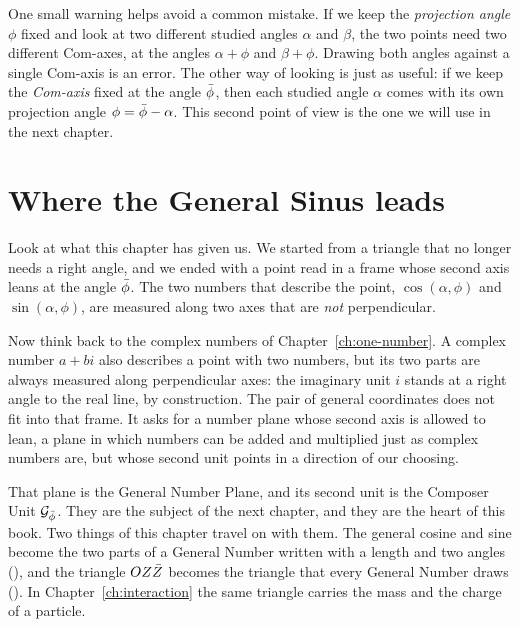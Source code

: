 One small warning helps avoid a common mistake. If we keep the \emph{projection angle} $\phi$ fixed and look at two different studied angles $\alpha$ and $\beta$, the two points need two different Com-axes, at the angles $\alpha + \phi$ and $\beta + \phi$. Drawing both angles against a single Com-axis is an error. The other way of looking is just as useful: if we keep the \emph{Com-axis} fixed at the angle $\bar{\phi}$, then each studied angle $\alpha$ comes with its own projection angle $\phi = \bar{\phi} - \alpha$. This second point of view is the one we will use in the next chapter.

\section{Where the General Sinus leads}\label{sec:gs-leads}

Look at what this chapter has given us. We started from a triangle that no longer needs a right angle, and we ended with a point read in a frame whose second axis leans at the angle $\bar{\phi}$. The two numbers that describe the point, $\cos(\alpha, \phi)$ and $\sin(\alpha, \phi)$, are measured along two axes that are \emph{not} perpendicular.

Now think back to the complex numbers of Chapter~\ref{ch:one-number}. A complex number $a + bi$ also describes a point with two numbers, but its two parts are always measured along perpendicular axes: the imaginary unit $i$ stands at a right angle to the real line, by construction. The pair of general coordinates does not fit into that frame. It asks for a number plane whose second axis is allowed to lean, a plane in which numbers can be added and multiplied just as complex numbers are, but whose second unit points in a direction of our choosing.

That plane is the General Number Plane, and its second unit is the Composer Unit $\mathcal{G}_{\bar{\phi}}$. They are the subject of the next chapter, and they are the heart of this book. Two things of this chapter travel on with them. The general cosine and sine become the two parts of a General Number written with a length and two angles (), and the triangle $OZ\bar{Z}$ becomes the triangle that every General Number draws (). In Chapter~\ref{ch:interaction} the same triangle carries the mass and the charge of a particle.

